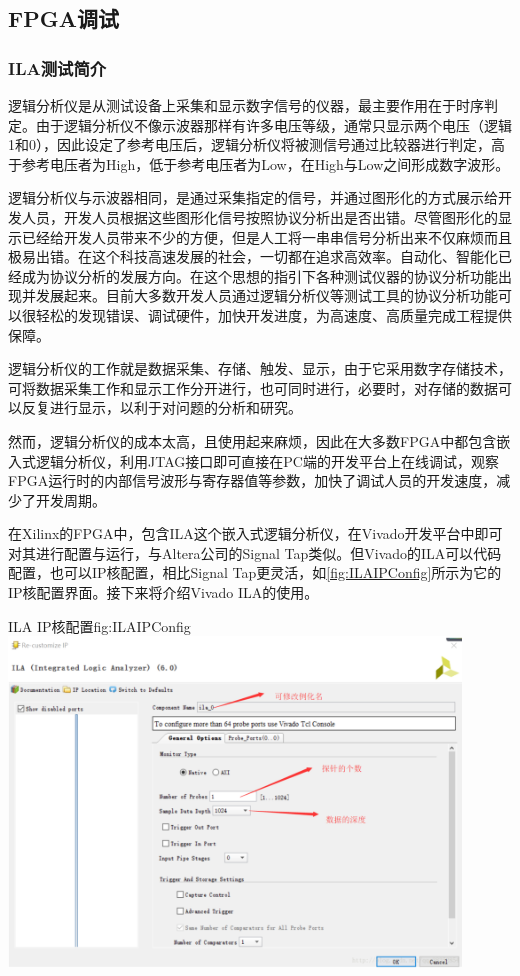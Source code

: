 \documentclass[supercite]{HustGraduPaper}
\begin{document}
\subsection{FPGA调试}

\subsubsection{ILA测试简介}


逻辑分析仪是从测试设备上采集和显示数字信号的仪器，最主要作用在于时序判定。由于逻辑分析仪不像示波器那样有许多电压等级，通常只显示两个电压（逻辑1和0），因此设定了参考电压后，逻辑分析仪将被测信号通过比较器进行判定，高于参考电压者为High，低于参考电压者为Low，在High与Low之间形成数字波形。

逻辑分析仪与示波器相同，是通过采集指定的信号，并通过图形化的方式展示给开发人员，开发人员根据这些图形化信号按照协议分析出是否出错。尽管图形化的显示已经给开发人员带来不少的方便，但是人工将一串串信号分析出来不仅麻烦而且极易出错。在这个科技高速发展的社会，一切都在追求高效率。自动化、智能化已经成为协议分析的发展方向。在这个思想的指引下各种测试仪器的协议分析功能出现并发展起来。目前大多数开发人员通过逻辑分析仪等测试工具的协议分析功能可以很轻松的发现错误、调试硬件，加快开发进度，为高速度、高质量完成工程提供保障。

逻辑分析仪的工作就是数据采集、存储、触发、显示，由于它采用数字存储技术，可将数据采集工作和显示工作分开进行，也可同时进行，必要时，对存储的数据可以反复进行显示，以利于对问题的分析和研究。

然而，逻辑分析仪的成本太高，且使用起来麻烦，因此在大多数FPGA中都包含嵌入式逻辑分析仪，利用JTAG接口即可直接在PC端的开发平台上在线调试，观察FPGA运行时的内部信号波形与寄存器值等参数，加快了调试人员的开发速度，减少了开发周期。

在Xilinx的FPGA中，包含ILA这个嵌入式逻辑分析仪，在Vivado开发平台中即可对其进行配置与运行，与Altera公司的Signal Tap类似。但Vivado的ILA可以代码配置，也可以IP核配置，相比Signal Tap更灵活，如\autoref{fig:ILAIPConfig}所示为它的IP核配置界面。接下来将介绍Vivado ILA的使用。

\begin{generalfig}[htb]{ILA IP核配置}{fig:ILAIPConfig}
	\includegraphics[width=12cm]{Figures/ILAIPConfig.png}
\end{generalfig}
\end{document}
